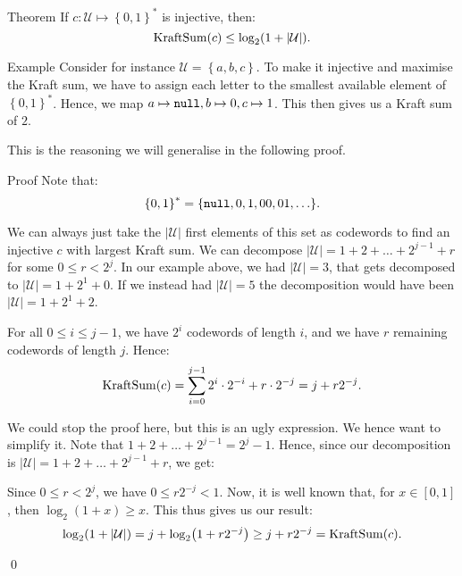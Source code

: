 \documentclass[a4paper]{article}
\begin{document}
\begin{parag}{Theorem}
    If $c: \mathcal{U} \mapsto \left\{0, 1\right\}^*$ is injective, then: 
    \[\KraftSum\left(c\right) \leq \log_2\left(1 + \left|\mathcal{U}\right|\right).\]

    \begin{subparag}{Example}
        Consider for instance $\mathcal{U} = \left\{a, b, c\right\}$. To make it injective and maximise the Kraft sum, we have to assign each letter to the smallest available element of $\left\{0, 1\right\}^*$. Hence, we map $a \mapsto \texttt{null}, b \mapsto 0, c \mapsto 1$. This then gives us a Kraft sum of $2$.

        This is the reasoning we will generalise in the following proof.
    \end{subparag}

    \begin{subparag}{Proof}
        Note that: 
        \[\left\{0, 1\right\}^* = \left\{\emptystring, 0, 1, 00, 01, \ldots\right\}.\]
        
        We can always just take the $\left|\mathcal{U}\right|$ first elements of this set as codewords to find an injective $c$ with largest Kraft sum. We can decompose $\left|\mathcal{U}\right| = 1 + 2 + \ldots + 2^{j-1} + r$ for some $0 \leq r < 2^j$. In our example above, we had $\left|\mathcal{U}\right| = 3$, that gets decomposed to $\left|\mathcal{U}\right| = 1 + 2^1 + 0$. If we instead had $\left|\mathcal{U}\right| = 5$ the decomposition would have been $\left|\mathcal{U}\right| = 1 + 2^1 + 2$.

        For all $0 \leq i \leq j-1$, we have $2^i$ codewords of length $i$, and we have $r$ remaining codewords of length $j$. Hence: 
        \[\KraftSum\left(c\right) = \sum_{i=0}^{j-1} 2^i \cdot  2^{-i} + r\cdot 2^{-j} = j + r 2^{-j}.\]
        
        We could stop the proof here, but this is an ugly expression. We hence want to simplify it. Note that $1 + 2 + \ldots + 2^{j-1} = 2^j - 1$. Hence, since our decomposition is $\left|\mathcal{U}\right| = 1 + 2 + \ldots + 2^{j-1} + r$, we get: 
        
        Since $0 \leq r < 2^j$, we have $0 \leq r 2^{-j} < 1$. Now, it is well known that, for $x \in \left[0, 1\right]$, then $\log_2\left(1 + x\right) \geq x$. This thus gives us our result: 
        \[\log_2\left(1 + \left|\mathcal{U}\right|\right) = j + \log_2\left(1 + r2^{-j}\right) \geq j + r 2^{-j} = \KraftSum\left(c\right).\]
        
        \qed
    \end{subparag} 
\end{parag}
\end{document}
